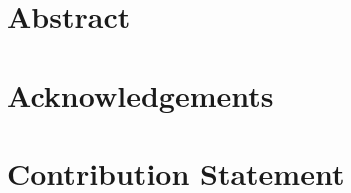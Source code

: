 \documentclass[11pt, twoside, openright]{book}
\newcommand{\markmargin}{}
\newlength{\spiff}
\newif\ifcontributionStatementOnly
\begin{document}
\newpage
\section*{Abstract}
\label{preamble:intro}


\cleardoublepage
\section*{Acknowledgements}
\label{preamble:acknowledgements}


\newpage

\fi  %
\section*{Contribution Statement}
\label{preamble:contributionstatement}


\ifcontributionStatementOnly
\else

\setcounter{tocdepth}{1}
\tableofcontents

\mainmatter



\renewcommand{\thesection}{\arabic{section}}
\renewcommand{\thefigure}{\arabic{figure}}
\renewcommand{\thetable}{\arabic{table}}
\renewcommand{\thechapter}{\Roman{chapter}}
\renewcommand{\theHchapter}{publication.\Roman{chapter}}
\renewcommand{\theHsection}{\theHchapter.\arabic{section}}
\renewcommand{\theequation}{\arabic{equation}}

\newlength{\apa}
\setlength{\apa}{0cm}
\setlength{\spiff}{0cm}

\renewcommand{\markmargin}{%
\begin{tikzpicture}[remember picture, overlay]%
\node at (current page text area.north -| current page.east) [
  anchor = north east,
  yshift = -\apa,
  rectangle,
  fill = black,
  minimum width = 1.6cm,
  minimum height = 2cm,
  inner sep = 0pt,
  outer sep = 0]
  (rec) {};
\node at (rec.south west) [
  anchor = north west,
  text width = 2cm,
  text height = 0.4cm,
  inner sep = 0,
  outer sep = 0,
  text centered,
  font=\sffamily\bfseries\small,
  color=white,
  rotate=90]
  {Paper~\thechapter};
\end{tikzpicture}%
}
\end{document}
